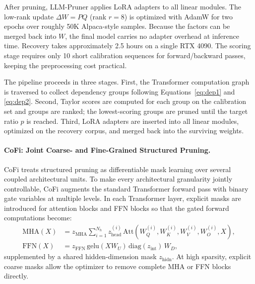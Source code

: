 After pruning, LLM-Pruner applies LoRA adapters \cite{hu2021lora} to all linear modules. The low-rank update $\Delta W = PQ$ (rank $r=8$) is optimized with AdamW for two epochs over roughly 50K Alpaca-style samples. Because the factors can be merged back into $W$, the final model carries no adapter overhead at inference time. Recovery takes approximately 2.5 hours on a single RTX 4090. The scoring stage requires only 10 short calibration sequences for forward/backward passes, keeping the preprocessing cost practical.

The pipeline proceeds in three stages. First, the Transformer computation graph is traversed to collect dependency groups following Equations~\eqref{eq:dep1} and \eqref{eq:dep2}. Second, Taylor scores are computed for each group on the calibration set and groups are ranked; the lowest-scoring groups are pruned until the target ratio $p$ is reached. Third, LoRA adapters are inserted into all linear modules, optimized on the recovery corpus, and merged back into the surviving weights.

\paragraph{CoFi: Joint Coarse- and Fine-Grained Structured Pruning.}
CoFi \cite{xia2022structured} treats structured pruning as differentiable mask learning over several coupled architectural units. To make every architectural granularity jointly controllable, CoFi augments the standard Transformer forward pass with binary gate variables at multiple levels. In each Transformer layer, explicit masks are introduced for attention blocks and FFN blocks so that the gated forward computations become:
\begin{align}
	\mathrm{MHA}(X) &= z_{\mathrm{MHA}} \sum_{i=1}^{N_h} z_{\mathrm{head}}^{(i)} \,\mathrm{Att}\!\left(W_Q^{(i)},W_K^{(i)},W_V^{(i)},W_O^{(i)},X\right), \\
	\mathrm{FFN}(X) &= z_{\mathrm{FFN}}\, \mathrm{gelu}(XW_U)\,\mathrm{diag}(z_{\mathrm{int}})\,W_D,
\end{align}
supplemented by a shared hidden-dimension mask $z_{\mathrm{hidn}}$. At high sparsity, explicit coarse masks allow the optimizer to remove complete MHA or FFN blocks directly.

